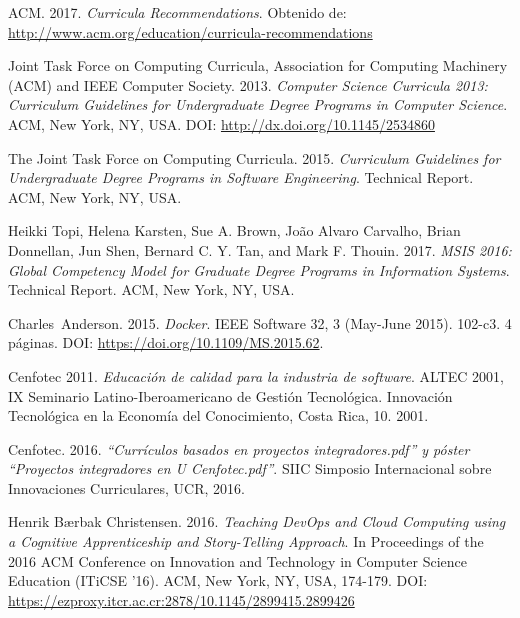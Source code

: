 \documentclass[journal]{IEEEtran}
\begin{document}
\begin{thebibliography}{1}




ACM. 2017. \emph{Curricula Recommendations}. Obtenido de: \url{http://www.acm.org/education/curricula-recommendations}

Joint Task Force on Computing Curricula, Association for Computing Machinery (ACM) and IEEE Computer Society. 2013. \emph{Computer Science Curricula 2013: Curriculum Guidelines for Undergraduate Degree Programs in Computer Science}. ACM, New York, NY, USA. DOI: \url{http://dx.doi.org/10.1145/2534860}

The Joint Task Force on Computing Curricula. 2015. \emph{Curriculum Guidelines for Undergraduate Degree Programs in Software Engineering}. Technical Report. ACM, New York, NY, USA. 

Heikki Topi, Helena Karsten, Sue A. Brown, João Alvaro Carvalho, Brian Donnellan, Jun Shen, Bernard C. Y. Tan, and Mark F. Thouin. 2017. \emph{MSIS 2016: Global Competency Model for Graduate Degree Programs in Information Systems}. Technical Report. ACM, New York, NY, USA.

Charles~Anderson. 2015. \emph{Docker}. IEEE Software 32, 3 (May-June 2015). 102-c3. 4 páginas.  DOI: \url{https://doi.org/10.1109/MS.2015.62}.

Cenfotec 2011. \emph{Educación de calidad para la industria de software}. ALTEC 2001, IX Seminario Latino-Iberoamericano de Gestión Tecnológica. Innovación Tecnológica en la Economía del Conocimiento, Costa Rica, 10. 2001.

Cenfotec. 2016. \emph{``Currículos basados en proyectos integradores.pdf'' y póster ``Proyectos integradores en U Cenfotec.pdf''}. SIIC Simposio Internacional sobre Innovaciones Curriculares, UCR, 2016.

Henrik Bærbak Christensen. 2016. \emph{Teaching DevOps and Cloud Computing using a Cognitive Apprenticeship and Story-Telling Approach}. In Proceedings of the 2016 ACM Conference on Innovation and Technology in Computer Science Education (ITiCSE '16). ACM, New York, NY, USA, 174-179. DOI: \url{https://ezproxy.itcr.ac.cr:2878/10.1145/2899415.2899426} 


\end{thebibliography}
\end{document}
